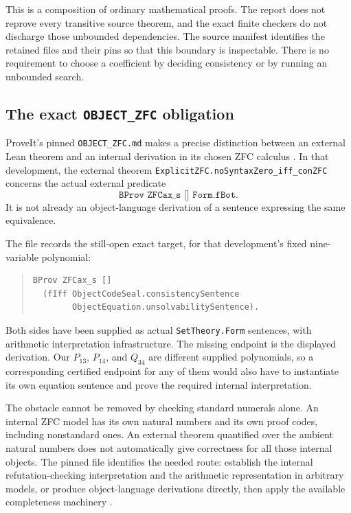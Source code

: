 \documentclass[11pt,a4paper]{article}
\theoremstyle{definition}
\begin{document}
This is a composition of ordinary mathematical proofs.  The report does
not reprove every transitive source theorem, and the exact finite
checkers do not discharge those unbounded dependencies.  The source
manifest identifies the retained files and their pins so that this
boundary is inspectable.  There is no requirement to choose a
coefficient by deciding consistency or by running an unbounded search.

\subsection{The exact \texttt{OBJECT\_ZFC} obligation}
\label{sec:object-language}

ProveIt's pinned \texttt{OBJECT\_ZFC.md} makes a precise distinction
between an external Lean theorem and an internal derivation in its
chosen ZFC calculus \cite{object-zfc}.  In that development, the external
theorem \texttt{ExplicitZFC.noSyntaxZero\_iff\_conZFC} concerns the
actual external predicate
\[
 \texttt{BProv ZFCax\_s [] Form.fBot}.
\]
It is not already an object-language derivation of a sentence expressing
the same equivalence.

The file records the still-open exact target, for that development's
fixed nine-variable polynomial:
\begin{quote}
\small
\begin{verbatim}
BProv ZFCax_s []
  (fIff ObjectCodeSeal.consistencySentence
        ObjectEquation.unsolvabilitySentence).
\end{verbatim}
\end{quote}
Both sides have been supplied as actual \texttt{SetTheory.Form}
sentences, with arithmetic interpretation infrastructure.  The missing
endpoint is the displayed derivation.  Our \(P_{13}\), \(P_{14}\), and \(Q_{34}\)
are different supplied polynomials, so a corresponding certified
endpoint for any of them would also have to instantiate its own equation
sentence and prove the required internal interpretation.

The obstacle cannot be removed by checking standard numerals alone.
An internal ZFC model has its own natural numbers and its own proof
codes, including nonstandard ones.  An external theorem quantified over
the ambient natural numbers does not automatically give correctness
for all those internal objects.  The pinned file identifies the needed
route: establish the internal refutation-checking interpretation and
the arithmetic representation in arbitrary models, or produce
object-language derivations directly, then apply the available
completeness machinery \cite{object-zfc}.
\end{document}
